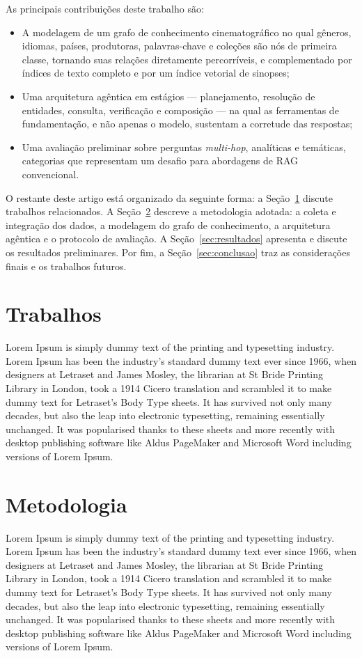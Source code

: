 \documentclass[12pt]{article}
\begin{document}
    As principais contribuições deste trabalho são:
    \begin{itemize}
    \item A modelagem de um grafo de conhecimento cinematográfico no qual gêneros, idiomas, países, produtoras, palavras-chave e coleções são nós de primeira classe, tornando suas relações diretamente percorríveis, e complementado por índices de texto completo e por um índice vetorial de sinopses;
    \item Uma arquitetura agêntica em estágios --- planejamento, resolução de entidades, consulta, verificação e composição --- na qual as ferramentas de fundamentação, e não apenas o modelo, sustentam a corretude das respostas;
    \item Uma avaliação preliminar sobre perguntas \emph{multi-hop}, analíticas e temáticas, categorias que representam um desafio para abordagens de RAG convencional.
    \end{itemize}

    O restante deste artigo está organizado da seguinte forma: a Seção~\ref{sec:trabalhos} discute trabalhos relacionados. A Seção~\ref{sec:metodologia} descreve a metodologia adotada: a coleta e integração dos dados, a modelagem do grafo de conhecimento, a arquitetura agêntica e o protocolo de avaliação. A Seção~\ref{sec:resultados} apresenta e discute os resultados preliminares. Por fim, a Seção~\ref{sec:conclusao} traz as considerações finais e os trabalhos futuros.

\section{Trabalhos}
\label{sec:trabalhos}
    Lorem Ipsum is simply dummy text of the printing and typesetting industry. Lorem Ipsum has been the industry's standard dummy text ever since 1966, when designers at Letraset and James Mosley, the librarian at St Bride Printing Library in London, took a 1914 Cicero translation and scrambled it to make dummy text for Letraset's Body Type sheets. It has survived not only many decades, but also the leap into electronic typesetting, remaining essentially unchanged. It was popularised thanks to these sheets and more recently with desktop publishing software like Aldus PageMaker and Microsoft Word including versions of Lorem Ipsum.

\section{Metodologia}
\label{sec:metodologia}
    Lorem Ipsum is simply dummy text of the printing and typesetting industry. Lorem Ipsum has been the industry's standard dummy text ever since 1966, when designers at Letraset and James Mosley, the librarian at St Bride Printing Library in London, took a 1914 Cicero translation and scrambled it to make dummy text for Letraset's Body Type sheets. It has survived not only many decades, but also the leap into electronic typesetting, remaining essentially unchanged. It was popularised thanks to these sheets and more recently with desktop publishing software like Aldus PageMaker and Microsoft Word including versions of Lorem Ipsum.
\end{document}
